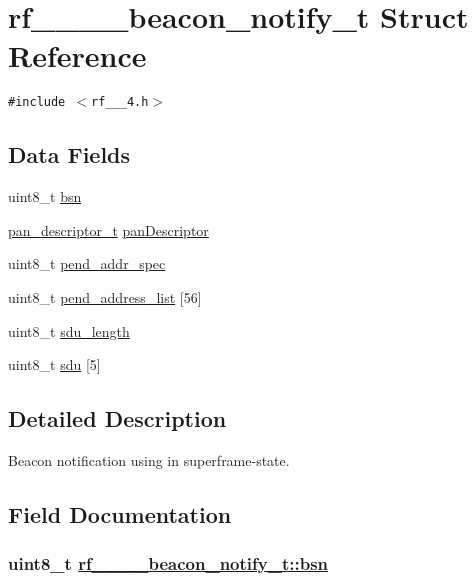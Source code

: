\hypertarget{structrf__802__15__4__beacon__notify__t}{
\section{rf\_\_\_\_\-beacon\_\-notify\_\-t Struct Reference}
\label{structrf__802__15__4__beacon__notify__t}
}
{\tt \#include $<$rf\_\_\_\-4.h$>$}

\subsection*{Data Fields}
\begin{CompactItemize}
\item 
uint8\_\-t \hyperlink{structrf__802__15__4__beacon__notify__t_f92b6f437f0c161dd5fe4049c55277e4}{bsn}
\item 
\hyperlink{structpan__descriptor__t}{pan\_\-descriptor\_\-t} \hyperlink{structrf__802__15__4__beacon__notify__t_95757d52f8c93f6b606bb18011c5c9ac}{pan\-Descriptor}
\item 
uint8\_\-t \hyperlink{structrf__802__15__4__beacon__notify__t_65ed3ca74f853fa41c161844d901d87d}{pend\_\-addr\_\-spec}
\item 
uint8\_\-t \hyperlink{structrf__802__15__4__beacon__notify__t_a8b0e217a6210483b05eeb7d631be1fd}{pend\_\-address\_\-list} \mbox{[}56\mbox{]}
\item 
uint8\_\-t \hyperlink{structrf__802__15__4__beacon__notify__t_615ecd7915386d4733ba13aa31d6a333}{sdu\_\-length}
\item 
uint8\_\-t \hyperlink{structrf__802__15__4__beacon__notify__t_5af4eff5ea62bc06bda82fc144abf6ed}{sdu} \mbox{[}5\mbox{]}
\end{CompactItemize}


\subsection{Detailed Description}
Beacon notification using in superframe-state. 



\subsection{Field Documentation}
\hypertarget{structrf__802__15__4__beacon__notify__t_f92b6f437f0c161dd5fe4049c55277e4}{
\subsubsection[bsn]{\setlength{\rightskip}{0pt plus 5cm}uint8\_\-t \hyperlink{structrf__802__15__4__beacon__notify__t_f92b6f437f0c161dd5fe4049c55277e4}{rf\_\_\_\_\-beacon\_\-notify\_\-t::bsn}}}
\label{structrf__802__15__4__beacon__notify__t_f92b6f437f0c161dd5fe4049c55277e4}


